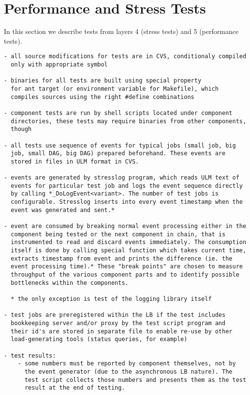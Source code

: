 \section{Performance and Stress Tests}

In this section we describe tests from layers 4 (stress tests) and 5 (performance tests). 

\begin{verbatim}
- all source modifications for tests are in CVS, conditionaly compiled
  only with appropriate symbol

- binaries for all tests are built using special property 
  for ant target (or environment variable for Makefile), which
  compiles sources using the right #define combinations

- component tests are run by shell scripts located under component
  directories, these tests may require binaries from other components,
  though

- all tests use sequence of events for typical jobs (small job, big
  job, small DAG, big DAG) prepared beforehand. These events are
  stored in files in ULM format in CVS.

- events are generated by stresslog program, which reads ULM text of
  events for particular test job and logs the event sequence directly
  by calling *_DoLogEvent<variant>. The number of test jobs is
  configurable. Stresslog inserts into every event timestamp when the
  event was generated and sent.*

- event are consumed by breaking normal event processing either in the
  component being tested or the next component in chain, that is
  instrumented to read and discard events immediately. The consumption
  itself is done by calling special function which takes current time,
  extracts timestamp from event and prints the difference (ie. the
  event processing time).* These "break points" are chosen to measure
  throughput of the various component parts and to identify possible
  bottlenecks within the components.

  * the only exception is test of the logging library itself

- test jobs are preregistered within the LB if the test includes
  bookkeeping server and/or proxy by the test script program and
  their id's are stored in separate file to enable re-use by other
  load-generating tools (status queries, for example)

- test results:
    - some numbers must be reported by component themselves, not by
      the event generator (due to the asynchronous LB nature). The
      test script collects those numbers and presents them as the test
      result at the end of testing.


\end{verbatim}
